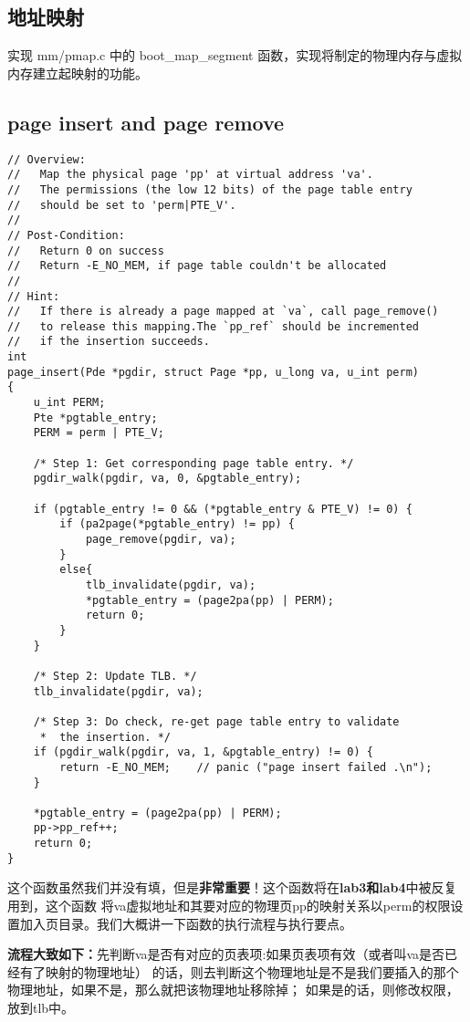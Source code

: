 \subsection{地址映射}

\begin{exercise}
实现 mm/pmap.c 中的 boot\_map\_segment 函数，实现将制定的物理内存与虚拟内存建立起映射的功能。
\end{exercise}

\subsection{page insert and page remove}

\begin{verbatim}
// Overview:
//   Map the physical page 'pp' at virtual address 'va'.
//   The permissions (the low 12 bits) of the page table entry 
//   should be set to 'perm|PTE_V'.
//
// Post-Condition:
//   Return 0 on success
//   Return -E_NO_MEM, if page table couldn't be allocated
// 
// Hint:
//   If there is already a page mapped at `va`, call page_remove() 
//   to release this mapping.The `pp_ref` should be incremented 
//   if the insertion succeeds.
int
page_insert(Pde *pgdir, struct Page *pp, u_long va, u_int perm)
{
	u_int PERM;
	Pte *pgtable_entry;
	PERM = perm | PTE_V;

	/* Step 1: Get corresponding page table entry. */
	pgdir_walk(pgdir, va, 0, &pgtable_entry);

	if (pgtable_entry != 0 && (*pgtable_entry & PTE_V) != 0) {
		if (pa2page(*pgtable_entry) != pp) {
			page_remove(pgdir, va);
		}
		else{
			tlb_invalidate(pgdir, va);
			*pgtable_entry = (page2pa(pp) | PERM);
			return 0;
		}
	}

	/* Step 2: Update TLB. */
	tlb_invalidate(pgdir, va);

	/* Step 3: Do check, re-get page table entry to validate 
	 *  the insertion. */
	if (pgdir_walk(pgdir, va, 1, &pgtable_entry) != 0) {
		return -E_NO_MEM;    // panic ("page insert failed .\n");
	}

	*pgtable_entry = (page2pa(pp) | PERM);
	pp->pp_ref++;
	return 0;
}
\end{verbatim}

这个函数虽然我们并没有填，但是\textbf{非常重要}！这个函数将在\textbf{lab3和lab4}中被反复用到，这个函数
将va虚拟地址和其要对应的物理页pp的映射关系以perm的权限设置加入页目录。我们大概讲一下函数的执行流程与执行要点。

\textbf{流程大致如下：}先判断va是否有对应的页表项:如果页表项有效（或者叫va是否已经有了映射的物理地址）
的话，则去判断这个物理地址是不是我们要插入的那个物理地址，如果不是，那么就把该物理地址移除掉；
如果是的话，则修改权限，放到tlb中。

